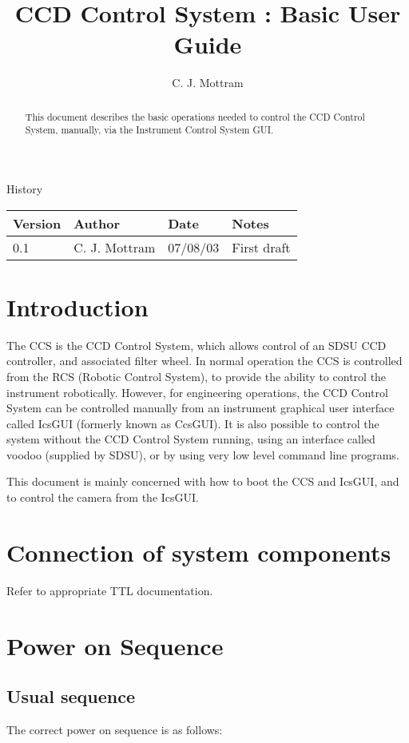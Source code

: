 \documentclass[10pt,a4paper]{article}
\title{CCD Control System : Basic User Guide}
\author{C. J. Mottram}
\date{}
\begin{document}
\thispagestyle{empty}
\maketitle
\begin{abstract}
This document describes the basic operations needed to control the CCD Control System, manually,
via the Instrument Control System GUI.
\end{abstract}

\centerline{\Large History}
\begin{center}
\begin{tabular}{|l|l|l|p{15em}|}
\hline
{\bf Version} & {\bf Author} & {\bf Date} & {\bf Notes} \\
\hline
0.1 & C. J. Mottram & 07/08/03 & First draft \\
\hline
\end{tabular}
\end{center}

\newpage
\tableofcontents
\listoffigures
\listoftables
\newpage

\section{Introduction}
The CCS is the CCD Control System, which allows control of an SDSU CCD controller, and associated filter wheel.
In normal operation the CCS is controlled from the RCS (Robotic Control System), to provide the ability
to control the instrument robotically. However, for engineering operations, the CCD Control System can be controlled
manually from an instrument graphical user interface called IcsGUI (formerly known as CcsGUI). It is also possible
to control the system without the CCD Control System running, using an interface called voodoo (supplied by SDSU),
or by using very low level command line programs.

This document is mainly concerned with how to boot the CCS and IcsGUI, and to control the camera from the IcsGUI.

\section{Connection of system components}
Refer to appropriate TTL documentation.

\section{Power on Sequence}
\subsection{Usual sequence}
The correct power on sequence is as follows:
\end{document}
